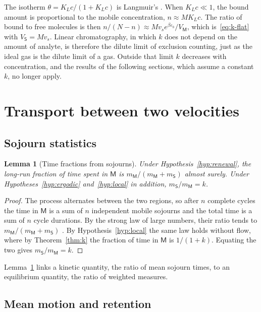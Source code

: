 \documentclass[11pt,a4paper]{article}
\newtheorem{lemma}[theorem]{Lemma}
\theoremstyle{definition}
\theoremstyle{remark}
\newcommand{\Mob}{\mathsf{M}}
\newcommand{\Sta}{\mathsf{S}}
\begin{document}
The isotherm $\theta=K_Lc/(1+K_Lc)$ is Langmuir's \citep{langmuir1918}.
When $K_Lc\ll1$, the bound amount is proportional to the mobile concentration, $n\approx MK_Lc$.
The ratio of bound to free molecules is then $n/(N-n)\approx Mv_se^{\beta\varepsilon_b}/V_\Mob$, which is~\eqref{eq:k-flat} with $V_\Sta=Mv_s$.
Linear chromatography, in which $k$ does not depend on the amount of analyte, is therefore the dilute limit of exclusion counting, just as the ideal gas is the dilute limit of a gas.
Outside that limit $k$ decreases with concentration, and the results of the following sections, which assume a constant $k$, no longer apply.

\section{Transport between two velocities}
\label{sec:transport}

\subsection{Sojourn statistics}

\begin{lemma}[Time fractions from sojourns]
\label{lem:fractions}
Under Hypothesis~\ref{hyp:renewal}, the long-run fraction of time spent in $\Mob$ is $m_\Mob/(m_\Mob+m_\Sta)$ almost surely.
Under Hypotheses~\ref{hyp:ergodic} and~\ref{hyp:local} in addition, $m_\Sta/m_\Mob=k$.
\end{lemma}

\begin{proof}
The process alternates between the two regions, so after $n$ complete cycles the time in $\Mob$ is a sum of $n$ independent mobile sojourns and the total time is a sum of $n$ cycle durations.
By the strong law of large numbers, their ratio tends to $m_\Mob/(m_\Mob+m_\Sta)$ \citep{cox1962}.
By Hypothesis~\ref{hyp:local} the same law holds without flow, where by Theorem~\ref{thm:k} the fraction of time in $\Mob$ is $1/(1+k)$.
Equating the two gives $m_\Sta/m_\Mob=k$.
\end{proof}

Lemma~\ref{lem:fractions} links a kinetic quantity, the ratio of mean sojourn times, to an equilibrium quantity, the ratio of weighted measures.

\subsection{Mean motion and retention}
\end{document}
